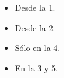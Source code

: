 \begin{itemize}
  \item<1-> Desde la 1.
  \item<2-> Desde la 2.
  \item<4>  Sólo en la 4.
  \item<3,5> En la 3 y 5.
\end{itemize}
